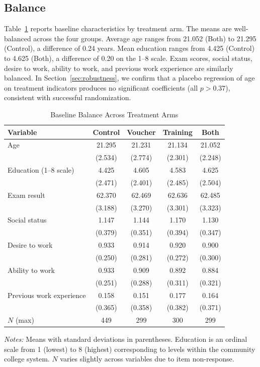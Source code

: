 \documentclass[12pt]{article}
\begin{document}
\subsection{Balance}

Table~\ref{tab:balance} reports baseline characteristics by treatment arm. The means are well-balanced across the four groups. Average age ranges from 21.052 (Both) to 21.295 (Control), a difference of 0.24 years. Mean education ranges from 4.425 (Control) to 4.625 (Both), a difference of 0.20 on the 1--8 scale. Exam scores, social status, desire to work, ability to work, and previous work experience are similarly balanced. In Section~\ref{sec:robustness}, we confirm that a placebo regression of age on treatment indicators produces no significant coefficients (all $p > 0.37$), consistent with successful randomization.

\begin{table}[htbp]
\centering
\caption{Baseline Balance Across Treatment Arms}
\label{tab:balance}
\begin{threeparttable}
\begin{tabular}{@{}lcccc@{}}
\toprule
Variable & Control & Voucher & Training & Both \\
\midrule
Age & 21.295 & 21.231 & 21.134 & 21.052 \\
 & (2.534) & (2.774) & (2.301) & (2.248) \\[3pt]
Education (1--8 scale) & 4.425 & 4.605 & 4.583 & 4.625 \\
 & (2.471) & (2.401) & (2.485) & (2.504) \\[3pt]
Exam result & 62.370 & 62.469 & 62.636 & 62.485 \\
 & (3.188) & (3.270) & (3.301) & (3.323) \\[3pt]
Social status & 1.147 & 1.144 & 1.170 & 1.130 \\
 & (0.379) & (0.351) & (0.394) & (0.347) \\[3pt]
Desire to work & 0.933 & 0.914 & 0.920 & 0.900 \\
 & (0.250) & (0.281) & (0.272) & (0.300) \\[3pt]
Ability to work & 0.933 & 0.909 & 0.892 & 0.884 \\
 & (0.251) & (0.288) & (0.311) & (0.321) \\[3pt]
Previous work experience & 0.158 & 0.151 & 0.177 & 0.164 \\
 & (0.365) & (0.358) & (0.382) & (0.371) \\[3pt]
\midrule
$N$ (max) & 449 & 299 & 300 & 299 \\
\bottomrule
\end{tabular}
\begin{tablenotes}[flushleft]
\small
\item \textit{Notes:} Means with standard deviations in parentheses. Education is an ordinal scale from 1 (lowest) to 8 (highest) corresponding to levels within the community college system. $N$ varies slightly across variables due to item non-response.
\end{tablenotes}
\end{threeparttable}
\end{table}
\end{document}
